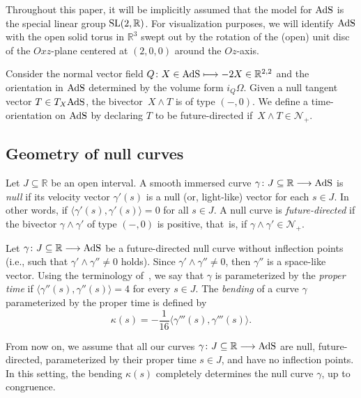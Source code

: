 \documentclass[pdftex]{sigma}
\numberwithin{equation}{section}
\def\bending{\kappa}
\def\R{\mathbb{R}}
\def\SL{{\rm SL}(2,\R)}
\def\AdS{{\rm AdS}}
\begin{document}
\begin{Remark}%
Throughout this paper, it will be implicitly assumed that the model for $\AdS$ is the special linear group $\SL$. For visualization purposes, we will identify $\AdS$ with the open solid torus in $\mathbb{R}^3$ swept out by the rotation of the (open) unit disc of the $Oxz$-plane centered at $(2,0,0)$ around the $Oz$-axis.
\end{Remark}

Consider the normal vector field $Q\colon X\in\AdS\longmapsto-2X\in\R^{2,2}$ and the orientation in $\AdS$ determined by the volume form $i_Q\Omega$. Given a null tangent vector $T\in T_X\AdS$, the bivector~${X\wedge T}$ is of type $(-,0)$. We define a time-orientation on $\AdS$ by declaring $T$ to be future-directed if~${X\wedge T\in\mathcal{N}_+}$.

\subsection{Geometry of null curves}

Let $J\subseteq\R$ be an open interval. A smooth immersed curve $\gamma\colon J\subseteq \mathbb{R}\longrightarrow \AdS$ is \emph{null} if its velocity vector $\gamma'(s)$ is a null (or, light-like) vector for each $s\in J$. In other words, if $\langle \gamma'(s),\gamma'(s)\rangle=0$ for all $s\in J$. A null curve is \emph{future-directed} if the bivector $\gamma\wedge\gamma'$ of type $(-,0)$ is positive, that~is, if $\gamma\wedge\gamma'\in\mathcal{N}_+$.

Let $\gamma\colon J\subseteq\R\longrightarrow\AdS$ be a future-directed null curve without inflection points (i.e., such that $\gamma'\wedge\gamma''\neq 0$ holds). Since $\gamma'\wedge\gamma''\neq 0$, then $\gamma''$ is a space-like vector. Using the terminology of~\cite{MP}, we say that $\gamma$ is parameterized by the \emph{proper time} if $\langle \gamma''(s),\gamma''(s)\rangle=4$ for every $s\in J$. The \emph{bending} of a curve $\gamma$ parameterized by the proper time is defined by
\begin{equation*}\bending(s)=-\frac{1}{16}\bigl\langle\gamma'''(s),\gamma'''(s)\bigr\rangle.\end{equation*}

\begin{Remark}\label{assumptions} From now on, we assume that all our curves $\gamma\colon J\subseteq\R\longrightarrow\AdS$ are null, future-directed, parameterized by their proper time $s\in J$, and have no inflection points. In this setting, the bending $\bending(s)$ completely determines the null curve $\gamma$, up to congruence.
\end{Remark}
\end{document}
